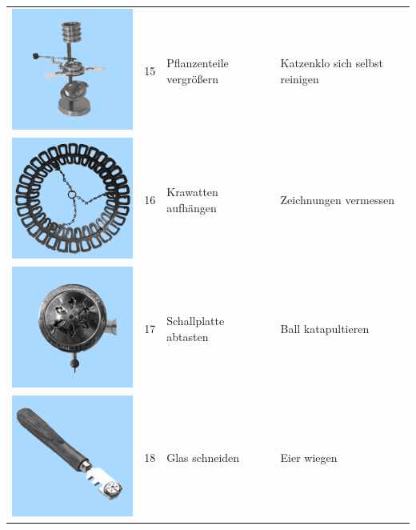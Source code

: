 \documentclass[
  english,
  doc,12pt,twoside,floatsintext]{apa7}
\begin{document}
\begin{center}
\begin{ThreePartTable}
\begin{longtable}{llll}
\includegraphics[valign=c, scale=0.19]{../materials/unfamiliar/15.png} & 15 & Pflanzenteile vergrößern & Katzenklo sich selbst reinigen\\
\includegraphics[valign=c, scale=0.19]{../materials/unfamiliar/16.png} & 16 & Krawatten aufhängen & Zeichnungen vermessen\\
\includegraphics[valign=c, scale=0.19]{../materials/unfamiliar/17.png} & 17 & Schallplatte abtasten & Ball katapultieren\\
\includegraphics[valign=c, scale=0.19]{../materials/unfamiliar/18.png} & 18 & Glas schneiden & Eier wiegen\\

\end{longtable}
\end{ThreePartTable}
\end{center}
\end{document}
